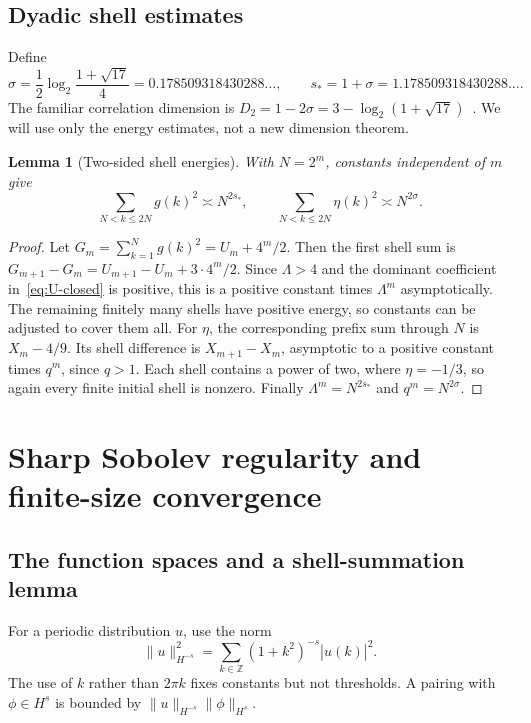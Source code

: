 \documentclass[11pt,a4paper]{article}
\numberwithin{equation}{section}
\newtheorem{lemma}[theorem]{Lemma}
\theoremstyle{definition}
\theoremstyle{remark}
\newcommand{\Z}{\mathbb Z}
\newcommand{\norm}[1]{\lVert #1\rVert}
\begin{document}
\subsection{Dyadic shell estimates}
Define
\begin{equation}
 \sigma=\frac12\log_2\frac{1+\sqrt{17}}4
       =0.178509318430288\ldots,\qquad
 s_* = 1+\sigma=1.178509318430288\ldots.
 \label{eq:exponents}
\end{equation}
The familiar correlation dimension is $D_2=1-2\sigma
=3-\log_2(1+\sqrt{17})$~\cite{ZPK}. We will use only the energy estimates,
not a new dimension theorem.

\begin{lemma}[Two-sided shell energies]
\label{lem:shell}
With $N=2^m$, constants independent of $m$ give
\begin{equation}
 \sum_{N<k\le2N}g(k)^2\asymp N^{2s_*},\qquad
 \sum_{N<k\le2N}\eta(k)^2\asymp N^{2\sigma}.
 \label{eq:shells}
\end{equation}
\end{lemma}
\begin{proof}
Let $G_m=\sum_{k=1}^Ng(k)^2=U_m+4^m/2$.
Then the first shell sum is
$G_{m+1}-G_m=U_{m+1}-U_m+3\cdot4^m/2$.
Since $\Lambda>4$ and the dominant coefficient in~\eqref{eq:U-closed} is
positive, this is a positive constant times $\Lambda^m$ asymptotically.
The remaining finitely many shells have positive energy, so constants can be
adjusted to cover them all. For $\eta$, the corresponding prefix sum through
$N$ is $X_m-4/9$. Its shell difference is $X_{m+1}-X_m$, asymptotic to a
positive constant times $q^m$, since $q>1$. Each shell contains a power of two,
where $\eta=-1/3$, so again every finite initial shell is nonzero. Finally
$\Lambda^m=N^{2s_*}$ and $q^m=N^{2\sigma}$.
\end{proof}

\section{Sharp Sobolev regularity and finite-size convergence}
\label{sec:sobolev}

\subsection{The function spaces and a shell-summation lemma}
For a periodic distribution $u$, use the norm
\begin{equation}
 \norm{u}_{H^{-s}}^2=
 \sum_{k\in\Z}(1+k^2)^{-s}|\widehat u(k)|^2.
 \label{eq:Sobolev}
\end{equation}
The use of $k$ rather than $2\pi k$ fixes constants but not thresholds. A pairing
with $\phi\in H^s$ is bounded by $\norm{u}_{H^{-s}}\norm{\phi}_{H^s}$.
\end{document}
